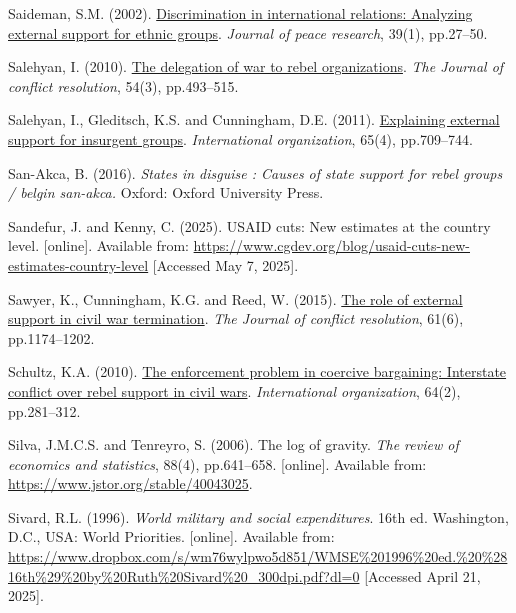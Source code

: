 \documentclass[
]{article}
\newlength{\cslhangindent}
\newenvironment{CSLReferences}[2] %
 {\begin{list}{}{%
  \setlength{\itemindent}{0pt}
  \setlength{\leftmargin}{0pt}
  \setlength{\parsep}{0pt}
  \ifodd #1
   \setlength{\leftmargin}{\cslhangindent}
   \setlength{\itemindent}{-1\cslhangindent}
  \fi
  \setlength{\itemsep}{#2\baselineskip}}}
 {\end{list}}
\begin{document}
\begin{CSLReferences}{0}{1}
Saideman, S.M. (2002).
\href{https://doi.org/10.1177/0022343302039001002}{Discrimination in
international relations: Analyzing external support for ethnic groups}.
\emph{Journal of peace research}, 39(1), pp.27--50.

Salehyan, I. (2010). \href{https://doi.org/10.1177/0022002709357890}{The
delegation of war to rebel organizations}. \emph{The Journal of conflict
resolution}, 54(3), pp.493--515.

Salehyan, I., Gleditsch, K.S. and Cunningham, D.E. (2011).
\href{https://doi.org/10.1017/S0020818311000233}{Explaining external
support for insurgent groups}. \emph{International organization}, 65(4),
pp.709--744.

San-Akca, B. (2016). \emph{States in disguise : Causes of state support
for rebel groups / belgin san-akca.} Oxford: Oxford University Press.

Sandefur, J. and Kenny, C. (2025). USAID cuts: New estimates at the
country level. {[}online{]}. Available from:
\url{https://www.cgdev.org/blog/usaid-cuts-new-estimates-country-level}
{[}Accessed May 7, 2025{]}.

Sawyer, K., Cunningham, K.G. and Reed, W. (2015).
\href{https://doi.org/10.1177/0022002715600761}{The role of external
support in civil war termination}. \emph{The Journal of conflict
resolution}, 61(6), pp.1174--1202.

Schultz, K.A. (2010).
\href{https://doi.org/10.1017/S0020818310000032}{The enforcement problem
in coercive bargaining: Interstate conflict over rebel support in civil
wars}. \emph{International organization}, 64(2), pp.281--312.

Silva, J.M.C.S. and Tenreyro, S. (2006). The log of gravity. \emph{The
review of economics and statistics}, 88(4), pp.641--658. {[}online{]}.
Available from: \url{https://www.jstor.org/stable/40043025}.

Sivard, R.L. (1996). \emph{World military and social expenditures}. 16th
ed. Washington, D.C., USA: World Priorities. {[}online{]}. Available
from:
\url{https://www.dropbox.com/s/wm76wylpwo5d851/WMSE\%201996\%20ed.\%20\%2816th\%29\%20by\%20Ruth\%20Sivard\%20_300dpi.pdf?dl=0}
{[}Accessed April 21, 2025{]}.


\end{CSLReferences}
\end{document}
